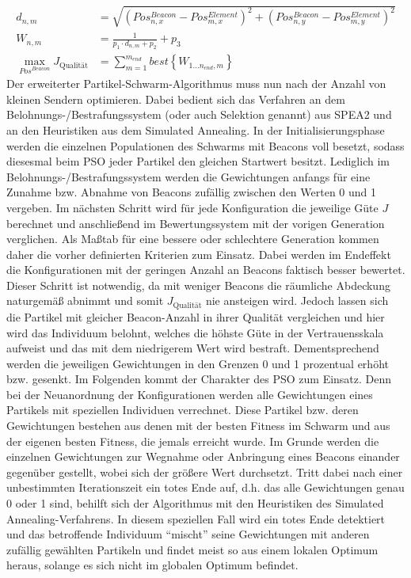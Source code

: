 \begin{align*}
d_{n,m} &= \sqrt{\left ( Pos^{Beacon}_{n,x} - Pos^{Element}_{m,x}\right )^2 + \left ( Pos^{Beacon}_{n,y} - Pos^{Element}_{m,y}\right )^2}\\
W_{n,m} &= \frac{1}{p_1\cdot d_{n,m}+p_2} + p_3\\
\underset{Pos^{Beacon}}{\max} J_{\text{Qualität}} &= \sum_{m=1}^{m_{end}}best\left \{ W_{1...n_{end},m} \right \}
\end{align*}
Der erweiterter Partikel-Schwarm-Algorithmus muss nun nach der Anzahl von kleinen Sendern optimieren. Dabei bedient sich das Verfahren an dem Belohnungs-/Bestrafungssystem (oder auch Selektion genannt) aus SPEA2 und an den Heuristiken aus dem Simulated Annealing. In der Initialisierungsphase werden die einzelnen Populationen des Schwarms mit Beacons voll besetzt, sodass diesesmal beim PSO jeder Partikel den gleichen Startwert besitzt. Lediglich im Belohnungs-/Bestrafungssystem werden die Gewichtungen anfangs für eine Zunahme bzw. Abnahme von Beacons zufällig zwischen den Werten 0 und 1 vergeben. Im nächsten Schritt wird für jede Konfiguration die jeweilige Güte $J$ berechnet und anschließend im Bewertungssystem mit der vorigen Generation verglichen. Als Maßtab für eine bessere oder schlechtere Generation kommen daher die vorher definierten Kriterien zum Einsatz. Dabei werden im Endeffekt die Konfigurationen mit der geringen Anzahl an Beacons faktisch besser bewertet. Dieser Schritt ist notwendig, da mit weniger Beacons die räumliche Abdeckung naturgemäß abnimmt und somit $J_{\text{Qualität}}$ nie ansteigen wird. Jedoch lassen sich die Partikel mit gleicher Beacon-Anzahl in ihrer Qualität vergleichen und hier wird das Individuum belohnt, welches die höhste Güte in der Vertrauensskala aufweist und das mit dem niedrigerem Wert wird bestraft. Dementsprechend werden die jeweiligen Gewichtungen in den Grenzen 0 und 1 prozentual erhöht bzw. gesenkt. Im Folgenden kommt der Charakter des PSO zum Einsatz. Denn bei der Neuanordnung der Konfigurationen werden alle Gewichtungen eines Partikels mit speziellen Individuen verrechnet. Diese Partikel bzw. deren Gewichtungen bestehen aus denen mit der besten Fitness im Schwarm und aus der eigenen besten Fitness, die jemals erreicht wurde. Im Grunde werden die einzelnen Gewichtungen zur Wegnahme oder Anbringung eines Beacons einander gegenüber gestellt, wobei sich der größere Wert durchsetzt. Tritt dabei nach einer unbestimmten Iterationszeit ein totes Ende auf, d.h. das alle Gewichtungen genau 0 oder 1 sind, behilft sich der Algorithmus mit den Heuristiken des Simulated Annealing-Verfahrens. In diesem speziellen Fall wird ein totes Ende detektiert und das betroffende Individuum "`mischt"' seine Gewichtungen mit anderen zufällig gewählten Partikeln und findet meist so aus einem lokalen Optimum heraus, solange es sich nicht im globalen Optimum befindet. \\ \\
